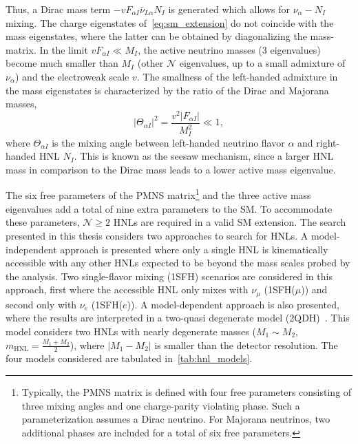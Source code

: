 Thus, a Dirac mass term $-vF_{\alpha I}\bar{\nu}_{L\alpha}N_I$ is generated which allows for $\nu_\alpha - N_I$ mixing. The charge eigenstates of~\cref{eq:sm_extension} do not coincide with the mass eigenstates, where the latter can be obtained by diagonalizing the mass-matrix. In the limit $vF_{\alpha I} \ll M_I$, the active neutrino masses (3 eigenvalues) become much smaller than $M_I$ (other $\mathcal{N}$ eigenvalues, up to a small admixture of $\nu_\alpha$) and the electroweak scale $v$. The smallness of the left-handed admixture in the mass eigenstates is characterized by the ratio of the Dirac and Majorana masses,
\begin{equation}\label{eq:mixing}
    |\Theta_{\alpha I}|^2=\frac{v^2|F_{\alpha I}|}{M_I^2} \ll 1,
\end{equation}
where $\Theta_{\alpha I}$ is the mixing angle between left-handed neutrino flavor $\alpha$ and right-handed HNL $N_I$. This is known as the seesaw mechanism, since a larger HNL mass in comparison to the Dirac mass leads to a lower active mass eigenvalue.

The six free parameters of the PMNS matrix\footnote{Typically, the PMNS matrix is defined with four free parameters consisting of three mixing angles and one charge-parity violating phase. Such a parameterization assumes a Dirac neutrino. For Majorana neutrinos, two additional phases are included for a total of six free parameters.} and the three active mass eigenvalues add a total of nine extra parameters to the SM. To accommodate these parameters, $\mathcal{N}\geq 2$ HNLs are required in a valid SM extension. The search presented in this thesis considers two approaches to search for HNLs. A model-independent approach is presented where only a single HNL is kinematically accessible with any other HNLs expected to be beyond the mass scales probed by the analysis. Two single-flavor mixing (1SFH) scenarios are considered in this approach, first where the accessible HNL only mixes with $\nu_\mu$ (1SFH($\mu$)) and second only with $\nu_e$ (1SFH($e$)). A model-dependent approach is also presented, where the results are interpreted in a two-quasi degenerate model (2QDH)~\cite{Tastet2021}. This model considers two HNLs with nearly degenerate masses ($M_1\sim M_2$, $m_\mathrm{HNL}=\frac{M_1+M_2}{2}$), where $|M_1-M_2|$ is smaller than the detector resolution. The four models considered are tabulated in~\cref{tab:hnl_models}.

